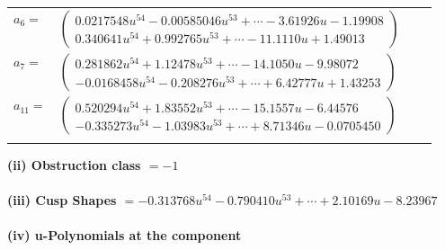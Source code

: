 \documentclass[1p]{elsarticle_modified}
\theoremstyle{definition}
\begin{document}
\begin{tabular}{m{7pt} m{180pt} m{7pt} m{180pt} }
\flushright $a_{6}=$&$\begin{pmatrix}0.0217548 u^{54}-0.00585046 u^{53}+\cdots-3.61926 u-1.19908\\0.340641 u^{54}+0.992765 u^{53}+\cdots-11.1110 u+1.49013\end{pmatrix}$ \\
\flushright $a_{7}=$&$\begin{pmatrix}0.281862 u^{54}+1.12478 u^{53}+\cdots-14.1050 u-9.98072\\-0.0168458 u^{54}-0.208276 u^{53}+\cdots+6.42777 u+1.43253\end{pmatrix}$ \\
\flushright $a_{11}=$&$\begin{pmatrix}0.520294 u^{54}+1.83552 u^{53}+\cdots-15.1557 u-6.44576\\-0.335273 u^{54}-1.03983 u^{53}+\cdots+8.71346 u-0.0705450\end{pmatrix}$\\&\end{tabular}
\flushleft \textbf{(ii) Obstruction class $= -1$}\\~\\
\flushleft \textbf{(iii) Cusp Shapes $= -0.313768 u^{54}-0.790410 u^{53}+\cdots+2.10169 u-8.23967$}\\~\\
\newpage\renewcommand{\arraystretch}{1}
\flushleft \textbf{(iv) u-Polynomials at the component}\newline \\
\end{document}
